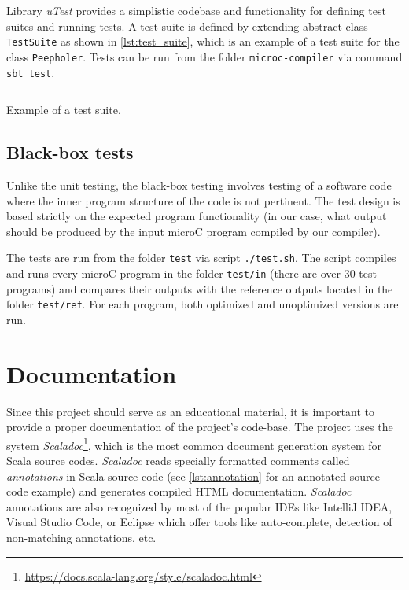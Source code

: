 \documentclass[thesis=M,english]{FITthesis}[2019/12/23]
\begin{document}
Library \emph{uTest} provides a simplistic codebase and functionality for defining test suites and running tests. A test suite is defined by extending abstract class \texttt{TestSuite} as shown in \autoref{lst:test_suite}, which is an example of a test suite for the class \texttt{Peepholer}. Tests can be run from the folder \texttt{microc-compiler} via command \texttt{sbt test}.

\begin{listing}[H]
	\inputminted[tabsize=2,breaklines,bgcolor=codebg]{scala}{snippets/test_suite.m}
	\caption{Example of a test suite.}
	\label{lst:test_suite}
\end{listing}

\subsection{Black-box tests}
Unlike the unit testing, the black-box testing involves testing of a software code where the inner program structure of the code is not pertinent. The test design is based strictly on the expected program functionality \cite[Chap. 8.2.2]{testing} (in our case, what output should be produced by the input microC program compiled by our compiler).

The tests are run from the folder \texttt{test} via script \texttt{./test.sh}. The script compiles and runs every microC program in the folder \texttt{test/in} (there are over 30 test programs) and compares their outputs with the reference outputs located in the folder \texttt{test/ref}. For each program, both optimized and unoptimized versions are run.


\section{Documentation}
Since this project should serve as an educational material, it is important to provide a proper documentation of the project's code-base. The project uses the system \emph{Scaladoc}\footnote{\url{https://docs.scala-lang.org/style/scaladoc.html}}, which is the most common document generation system for Scala source codes. \emph{Scaladoc} reads specially formatted comments called \emph{annotations} in Scala source code (see \autoref{lst:annotation} for an annotated source code example) and generates compiled HTML documentation. \emph{Scaladoc} annotations are also recognized by most of the popular IDEs like IntelliJ IDEA, Visual Studio Code, or Eclipse which offer tools like auto-complete, detection of non-matching annotations, etc.
\end{document}
